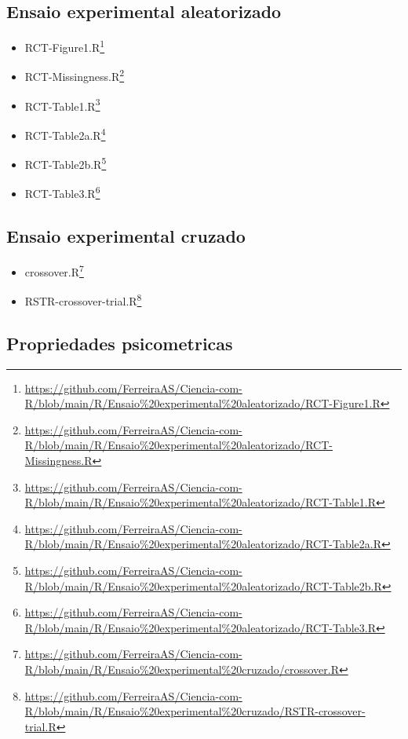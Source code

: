 \documentclass[
  a4paper,
]{book}
\renewcommand{\href}[2]{#2\footnote{\url{#1}}}
\begin{document}
\hypertarget{ensaio-experimental-aleatorizado}{%
\subsection{Ensaio experimental aleatorizado}\label{ensaio-experimental-aleatorizado}}

\begin{itemize}
\item
  \href{https://github.com/FerreiraAS/Ciencia-com-R/blob/main/R/Ensaio\%20experimental\%20aleatorizado/RCT-Figure1.R}{RCT-Figure1.R}
\item
  \href{https://github.com/FerreiraAS/Ciencia-com-R/blob/main/R/Ensaio\%20experimental\%20aleatorizado/RCT-Missingness.R}{RCT-Missingness.R}
\item
  \href{https://github.com/FerreiraAS/Ciencia-com-R/blob/main/R/Ensaio\%20experimental\%20aleatorizado/RCT-Table1.R}{RCT-Table1.R}
\item
  \href{https://github.com/FerreiraAS/Ciencia-com-R/blob/main/R/Ensaio\%20experimental\%20aleatorizado/RCT-Table2a.R}{RCT-Table2a.R}
\item
  \href{https://github.com/FerreiraAS/Ciencia-com-R/blob/main/R/Ensaio\%20experimental\%20aleatorizado/RCT-Table2b.R}{RCT-Table2b.R}
\item
  \href{https://github.com/FerreiraAS/Ciencia-com-R/blob/main/R/Ensaio\%20experimental\%20aleatorizado/RCT-Table3.R}{RCT-Table3.R}
\end{itemize}

\hypertarget{ensaio-experimental-cruzado}{%
\subsection{Ensaio experimental cruzado}\label{ensaio-experimental-cruzado}}

\begin{itemize}
\item
  \href{https://github.com/FerreiraAS/Ciencia-com-R/blob/main/R/Ensaio\%20experimental\%20cruzado/crossover.R}{crossover.R}
\item
  \href{https://github.com/FerreiraAS/Ciencia-com-R/blob/main/R/Ensaio\%20experimental\%20cruzado/RSTR-crossover-trial.R}{RSTR-crossover-trial.R}
\end{itemize}

\hypertarget{propriedades-psicometricas}{%
\subsection{Propriedades psicometricas}\label{propriedades-psicometricas}}
\end{document}
